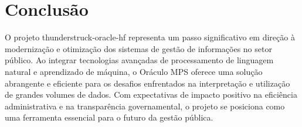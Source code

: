 \documentclass[11pt]{article}
\begin{document}
\section{Conclusão}
\label{sec:orgbd4b4ac}

O projeto thunderstruck-oracle-hf representa um passo significativo em direção à modernização e otimização dos sistemas de gestão de informações no setor público. Ao integrar tecnologias avançadas de processamento de linguagem natural e aprendizado de máquina, o Oráculo MPS oferece uma solução abrangente e eficiente para os desafios enfrentados na interpretação e utilização de grandes volumes de dados. Com expectativas de impacto positivo na eficiência administrativa e na transparência governamental, o projeto se posiciona como uma ferramenta essencial para o futuro da gestão pública.
\end{document}

